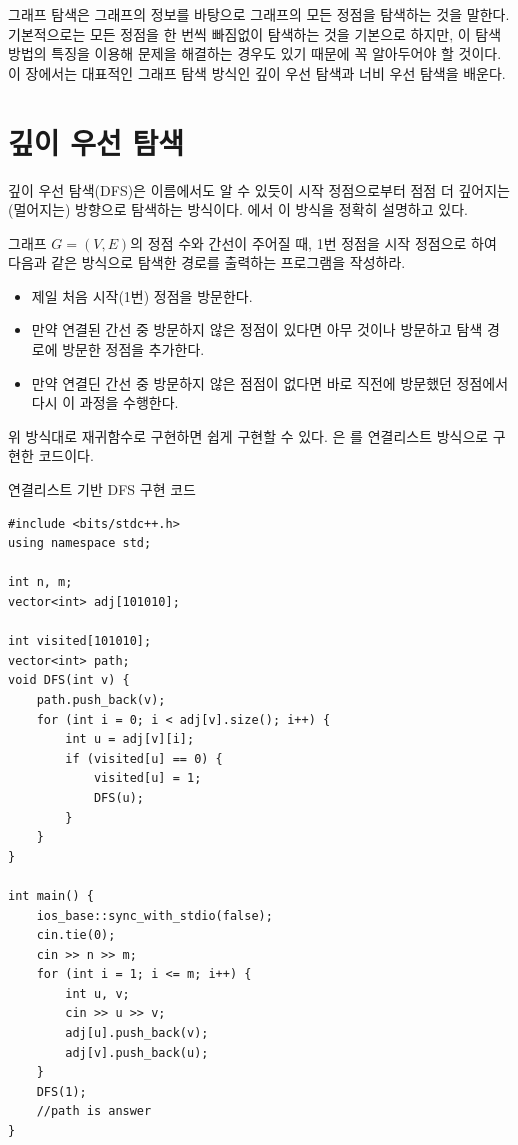 그래프 탐색은 그래프의 정보를 바탕으로 그래프의 모든 정점을 탐색하는 것을 말한다. 기본적으로는 모든 정점을 한 번씩 빠짐없이 탐색하는 것을 기본으로 하지만, 이 탐색 방법의 특징을 이용해 문제을 해결하는 경우도 있기 때문에 꼭 알아두어야 할 것이다. 이 장에서는 대표적인 그래프 탐색 방식인 깊이 우선 탐색과 너비 우선 탐색을 배운다.

\section{깊이 우선 탐색}
깊이 우선 탐색(DFS)은 이름에서도 알 수 있듯이 시작 정점으로부터 점점 더 깊어지는(멀어지는) 방향으로 탐색하는 방식이다. 에서 이 방식을 정확히 설명하고 있다.
\begin{example} \label{ex: DFS}
    그래프 $G = (V, E)$의 정점 수와 간선이 주어질 때, 1번 정점을 시작 정점으로 하여 다음과 같은 방식으로 탐색한 경로를 출력하는 프로그램을 작성하라.
    \begin{itemize}
        \item 제일 처음 시작(1번) 정점을 방문한다.
        \item 만약 연결된 간선 중 방문하지 않은 정점이 있다면 아무 것이나 방문하고 탐색 경로에 방문한 정점을 추가한다.
        \item 만약 연결딘 간선 중 방문하지 않은 점점이 없다면 바로 직전에 방문했던 정점에서 다시 이 과정을 수행한다.
    \end{itemize}
\end{example}

위 방식대로 재귀함수로 구현하면 쉽게 구현할 수 있다. 은 를 연결리스트 방식으로 구현한 코드이다.
\begin{code} \label{code: DFS}
연결리스트 기반 DFS 구현 코드
\begin{lstlisting}
#include <bits/stdc++.h>
using namespace std;

int n, m;
vector<int> adj[101010];

int visited[101010];
vector<int> path;
void DFS(int v) {
    path.push_back(v);
    for (int i = 0; i < adj[v].size(); i++) {
        int u = adj[v][i];
        if (visited[u] == 0) {
            visited[u] = 1;
            DFS(u);
        }
    }
}

int main() {
    ios_base::sync_with_stdio(false);
    cin.tie(0);
    cin >> n >> m;
    for (int i = 1; i <= m; i++) {
        int u, v;
        cin >> u >> v;
        adj[u].push_back(v);
        adj[v].push_back(u);
    }
    DFS(1);
    //path is answer
}
\end{lstlisting}
\end{code}

